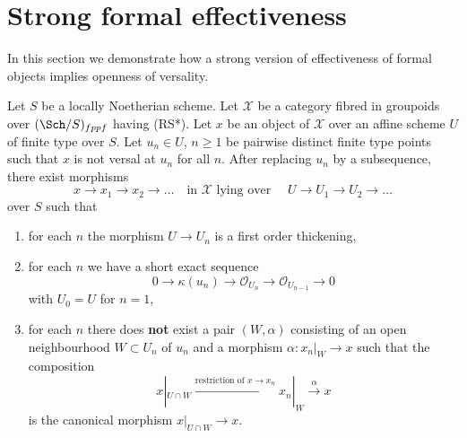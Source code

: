 \section{Strong formal effectiveness}
\label{section-strong-formal-effectiveness}

\noindent
In this section we demonstrate how a strong version of effectiveness
of formal objects implies openness of versality.

\begin{lemma}
\label{lemma-infinite-sequence}
Let $S$ be a locally Noetherian scheme. Let $\mathcal{X}$ be a category
fibred in groupoids over $(\Sch/S)_{fppf}$ having (RS*).
Let $x$ be an object of
$\mathcal{X}$ over an affine scheme $U$ of finite type over $S$.
Let $u_n \in U$, $n \geq 1$ be pairwise distinct finite type points
such that $x$ is not versal at $u_n$ for all $n$. After replacing
$u_n$ by a subsequence, there exist morphisms
$$
x \to x_1 \to x_2 \to \ldots
\quad\text{in }\mathcal{X}\text{ lying over }\quad
U \to U_1 \to U_2 \to \ldots
$$
over $S$ such that
\begin{enumerate}
\item for each $n$ the morphism $U \to U_n$ is a first order
thickening,
\item for each $n$ we have a short exact sequence
$$
0 \to \kappa(u_n) \to \mathcal{O}_{U_n} \to \mathcal{O}_{U_{n - 1}} \to 0
$$
with $U_0 = U$ for $n = 1$,
\item for each $n$ there does {\bf not} exist a pair $(W, \alpha)$
consisting of an open neighbourhood $W \subset U_n$ of $u_n$
and a morphism $\alpha : x_n|_W \to x$
such that the composition
$$
x|_{U \cap W} \xrightarrow{\text{restriction of }x \to x_n}
x_n|_W \xrightarrow{\alpha} x
$$
is the canonical morphism $x|_{U \cap W} \to x$.
\end{enumerate}
\end{lemma}

